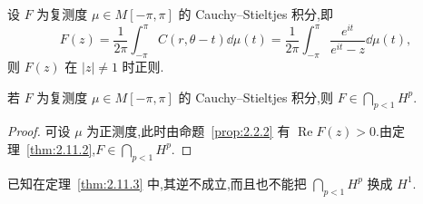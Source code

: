 设 $F$ 为复测度 $\mu \in M[-\pi, \pi]$ 的 Cauchy--Stieltjes 积分,即
\begin{equation*}
F(z) = \frac{1}{2\pi}\int_{-\pi}^{\pi} C(r, \theta - t)\dd \mu(t) = \frac{1}{2\pi}\int_{-\pi}^{\pi} \frac{e^{it}}{e^{it} - z}\dd \mu(t),
\end{equation*}
则 $F(z)$ 在 $|z| \neq 1$ 时正则.

\begin{theorem}\label{thm:2.11.3}
若 $F$ 为复测度 $\mu \in M[-\pi, \pi]$ 的 Cauchy--Stieltjes 积分,则 $F \in \bigcap_{p<1} H^{p}$.
\end{theorem}

\begin{proof}
可设 $\mu$ 为正测度,此时由命题~\ref{prop:2.2.2} 有 $\operatorname{Re} F(z) > 0$.由定理~\ref{thm:2.11.2},$F \in \bigcap_{p<1} H^{p}$.
\end{proof}

已知在定理~\ref{thm:2.11.3} 中,其逆不成立,而且也不能把 $\bigcap_{p<1} H^{p}$ 换成 $H^{1}$.
